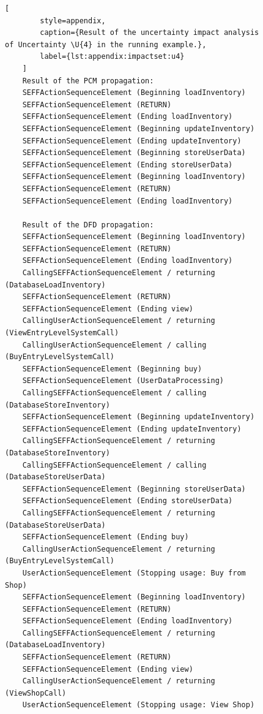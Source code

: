 \begin{figure}
    \begin{lstlisting}[
        style=appendix,
        caption={Result of the uncertainty impact analysis of Uncertainty \U{4} in the running example.},
        label={lst:appendix:impactset:u4}
    ]
    Result of the PCM propagation:
    SEFFActionSequenceElement (Beginning loadInventory)
    SEFFActionSequenceElement (RETURN)
    SEFFActionSequenceElement (Ending loadInventory)
    SEFFActionSequenceElement (Beginning updateInventory)
    SEFFActionSequenceElement (Ending updateInventory)
    SEFFActionSequenceElement (Beginning storeUserData)
    SEFFActionSequenceElement (Ending storeUserData)
    SEFFActionSequenceElement (Beginning loadInventory)
    SEFFActionSequenceElement (RETURN)
    SEFFActionSequenceElement (Ending loadInventory)

    Result of the DFD propagation:
    SEFFActionSequenceElement (Beginning loadInventory)
    SEFFActionSequenceElement (RETURN)
    SEFFActionSequenceElement (Ending loadInventory)
    CallingSEFFActionSequenceElement / returning (DatabaseLoadInventory)
    SEFFActionSequenceElement (RETURN)
    SEFFActionSequenceElement (Ending view)
    CallingUserActionSequenceElement / returning (ViewEntryLevelSystemCall)
    CallingUserActionSequenceElement / calling (BuyEntryLevelSystemCall)
    SEFFActionSequenceElement (Beginning buy)
    SEFFActionSequenceElement (UserDataProcessing)
    CallingSEFFActionSequenceElement / calling (DatabaseStoreInventory)
    SEFFActionSequenceElement (Beginning updateInventory)
    SEFFActionSequenceElement (Ending updateInventory)
    CallingSEFFActionSequenceElement / returning (DatabaseStoreInventory)
    CallingSEFFActionSequenceElement / calling (DatabaseStoreUserData)
    SEFFActionSequenceElement (Beginning storeUserData)
    SEFFActionSequenceElement (Ending storeUserData)
    CallingSEFFActionSequenceElement / returning (DatabaseStoreUserData)
    SEFFActionSequenceElement (Ending buy)
    CallingUserActionSequenceElement / returning (BuyEntryLevelSystemCall)
    UserActionSequenceElement (Stopping usage: Buy from Shop)
    SEFFActionSequenceElement (Beginning loadInventory)
    SEFFActionSequenceElement (RETURN)
    SEFFActionSequenceElement (Ending loadInventory)
    CallingSEFFActionSequenceElement / returning (DatabaseLoadInventory)
    SEFFActionSequenceElement (RETURN)
    SEFFActionSequenceElement (Ending view)
    CallingUserActionSequenceElement / returning (ViewShopCall)
    UserActionSequenceElement (Stopping usage: View Shop)
    \end{lstlisting}
\end{figure}





